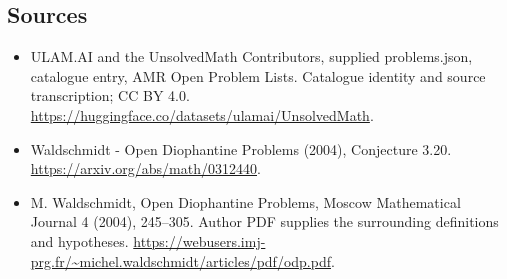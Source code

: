 \documentclass[11pt,a4paper]{article}
\begin{document}
\subsection{Sources}
\begin{itemize}
\item[S1] ULAM.AI and the UnsolvedMath Contributors, supplied problems.json, catalogue entry, AMR Open Problem Lists. Catalogue identity and source transcription; CC BY 4.0.
\url{https://huggingface.co/datasets/ulamai/UnsolvedMath}.
\item[S2] Waldschmidt - Open Diophantine Problems (2004), Conjecture 3.20. 
\url{https://arxiv.org/abs/math/0312440}.
\item[S3] M. Waldschmidt, Open Diophantine Problems, Moscow Mathematical Journal 4 (2004), 245–305. Author PDF supplies the surrounding definitions and hypotheses.
\url{https://webusers.imj-prg.fr/~michel.waldschmidt/articles/pdf/odp.pdf}.
\end{itemize}
\end{document}
